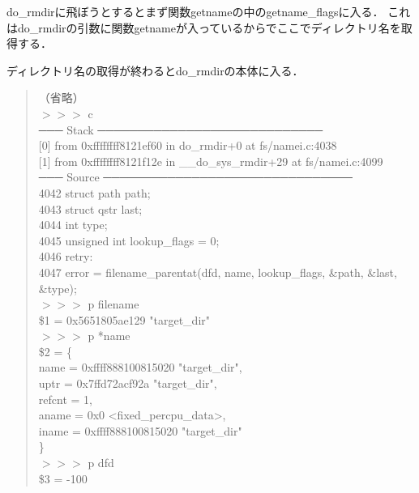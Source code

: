 do\_rmdirに飛ぼうとするとまず関数getnameの中のgetname\_flagsに入る．
これはdo\_rmdirの引数に関数getnameが入っているからでここでディレクトリ名を取得する．

ディレクトリ名の取得が終わるとdo\_rmdirの本体に入る．
\begin{quote}
（省略） \\
$>>>$ c \\
─── Stack ────────────────────────────
\\
{[0]} from 0xffffffff8121ef60 in do\_rmdir+0 at fs/namei.c:4038 \\
{[1]} from 0xffffffff8121f12e in \_\_do\_sys\_rmdir+29 at fs/namei.c:4099 \\
─── Source ───────────────────────────────
    \\
 4042      struct path path; \\
 4043      struct qstr last; \\
 4044      int type; \\
 4045      unsigned int lookup\_flags = 0; \\
 4046  retry: \\
 4047      error = filename\_parentat(dfd, name, lookup\_flags, \&path, \&last, \&type); \\
$>>>$ p filename \\
\$1 = 0x5651805ae129 "target\_dir" \\
$>>>$ p *name \\
\$2 = \{ \\
  name = 0xffff888100815020 "target\_dir", \\
  uptr = 0x7ffd72acf92a "target\_dir", \\
  refcnt = 1, \\
  aname = 0x0 <fixed\_percpu\_data>, \\
  iname = 0xffff888100815020 "target\_dir" \\
\} \\
$>>>$ p dfd \\
\$3 = -100
\end{quote}


